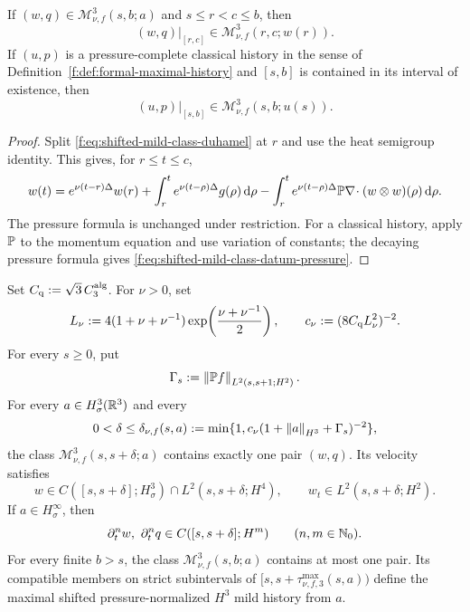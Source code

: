 \begin{lemma}
\label{f:lem:shifted-mild-restriction}
If \((w,q)\in\mathscr M_{\nu,f}^3(s,b;a)\) and
\(s\le r<c\le b\), then
\begin{equation}
 (w,q)|_{[r,c]}\in\mathscr M_{\nu,f}^3(r,c;w(r)).
 \label{f:eq:shifted-mild-restriction}
\end{equation}
If \((u,p)\) is a pressure-complete classical history in the sense of
Definition~\ref{f:def:formal-maximal-history} and
\([s,b]\) is contained in its interval of existence, then
\begin{equation}
 (u,p)|_{[s,b]}\in\mathscr M_{\nu,f}^3(s,b;u(s)).
 \label{f:eq:classical-mild-admission}
\end{equation}
\end{lemma}

\begin{proof}
Split \eqref{f:eq:shifted-mild-class-duhamel} at \(r\) and use the heat
semigroup identity.  This gives, for \(r\le t\le c\),
\[
 w(t)=e^{\nu(t-r)\Delta}w(r)
 +\int_r^t e^{\nu(t-\rho)\Delta}g(\rho)\,\mathrm d\rho
 -\int_r^t e^{\nu(t-\rho)\Delta}
 \mathbb P\nabla\!\cdot(w\otimes w)(\rho)\,\mathrm d\rho.
\]
The pressure formula is unchanged under restriction.  For a classical
history, apply \(\mathbb P\) to the momentum equation and use variation of
constants; the decaying pressure formula gives
\eqref{f:eq:shifted-mild-class-datum-pressure}.
\end{proof}

\begin{theorem}
\label{f:thm:local-restart}
Set \(C_{\rm q}:=\sqrt3\,C_3^{\rm alg}\).  For \(\nu>0\), set
\[
 L_\nu:=4(1+\nu+\nu^{-1})
 \exp\!\left(\frac{\nu+\nu^{-1}}2\right),
 \qquad
 c_\nu:=(8C_{\rm q}L_\nu^2)^{-2}.
\]
For every \(s\ge0\), put
\[
 \Gamma_s:=\left\lVert \mathbb P f\right\rVert_{L^2(s,s+1;H^2)}.
\]
For every \(a\in H^3_\sigma(\mathbb R^3)\) and every
\[
 0<\delta\le\delta_{\nu,f}(s,a)
 :=\min\{1,c_\nu(1+\left\lVert a\right\rVert_{H^3}+\Gamma_s)^{-2}\},
\]
the class \(\mathscr M_{\nu,f}^3(s,s+\delta;a)\) contains exactly one pair
\((w,q)\).  Its velocity satisfies
\[
 w\in C([s,s+\delta];H^3_\sigma)
 \cap L^2(s,s+\delta;H^4),
 \qquad
 w_t\in L^2(s,s+\delta;H^2).
\]
If \(a\in H^\infty_\sigma\), then
\[
 \partial_t^nw,\ \partial_t^nq
 \in C([s,s+\delta];H^m)
 \qquad(n,m\in\mathbb N_0).
\]
For every finite \(b>s\), the class
\(\mathscr M_{\nu,f}^3(s,b;a)\) contains at most one pair.  Its compatible members
on strict subintervals of
\([s,s+\tau_{\nu,f,3}^{\max}(s,a))\) define the maximal shifted
pressure-normalized \(H^3\) mild history from \(a\).
\end{theorem}

